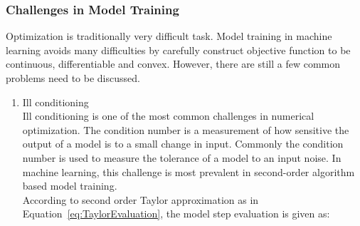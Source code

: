 \subsubsection{Challenges in Model Training}

Optimization is traditionally very difficult task. Model training in machine learning avoids many difficulties by carefully construct objective function to be continuous, differentiable and convex. However, there are still a few common problems need to be discussed. 

\begin{enumerate}
    \item Ill conditioning\\
Ill conditioning is one of the most common challenges in numerical optimization. The condition number is a measurement of how sensitive the output of a model is to a small change in input. Commonly the condition number is used to measure the tolerance of a model to an input noise. In machine learning, this challenge is most prevalent in second-order algorithm based model training.\\

According to second order Taylor approximation as in Equation~\ref{eq:TaylorEvaluation}, the model step evaluation is given as:


\end{enumerate}
